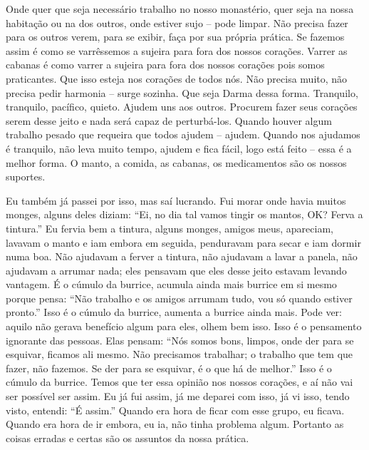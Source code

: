 Onde quer que seja necessário trabalho no nosso monastério, quer
seja na nossa habitação ou na dos outros, onde estiver sujo – pode
limpar. Não precisa fazer para os outros verem, para se exibir, faça
por sua própria prática. Se fazemos assim é como se varrêssemos a
sujeira para fora dos nossos corações. Varrer as cabanas é como varrer
a sujeira para fora dos nossos corações pois somos praticantes. Que
isso esteja nos corações de todos nós. Não precisa muito, não precisa
pedir harmonia – surge sozinha. Que seja Darma dessa forma. Tranquilo,
tranquilo, pacífico, quieto. Ajudem uns aos outros. Procurem fazer seus
corações serem desse jeito e nada será capaz de perturbá-los. Quando
houver algum trabalho pesado que requeira que todos ajudem – ajudem.
Quando nos ajudamos é tranquilo, não leva muito tempo, ajudem e fica
fácil, logo está feito – essa é a melhor forma. O manto, a comida, as
cabanas, os medicamentos são os nossos suportes.

Eu também já passei por isso, mas saí lucrando. Fui morar onde havia
muitos monges, alguns deles diziam: “Ei, no dia tal vamos tingir os
mantos, \textsc{OK}? Ferva a tintura.” Eu fervia bem a tintura, alguns monges,
amigos meus, apareciam, lavavam o manto e iam embora em seguida,
penduravam para secar e iam dormir numa boa. Não ajudavam a ferver a
tintura, não ajudavam a lavar a panela, não ajudavam a arrumar nada;
eles pensavam que eles desse jeito estavam levando vantagem. É o cúmulo
da burrice, acumula ainda mais burrice em si mesmo porque pensa: “Não
trabalho e os amigos arrumam tudo, vou só quando estiver pronto.” Isso
é o cúmulo da burrice, aumenta a burrice ainda mais. Pode ver: aquilo
não gerava benefício algum para eles, olhem bem isso. Isso é o
pensamento ignorante das pessoas. Elas pensam: “Nós somos bons, limpos,
onde der para se esquivar, ficamos ali mesmo. Não precisamos trabalhar;
o trabalho que tem que fazer, não fazemos. Se der para se esquivar, é o
que há de melhor.” Isso é o cúmulo da burrice. Temos que ter essa
opinião nos nossos corações, e aí não vai ser possível ser assim. Eu já
fui assim, já me deparei com isso, já vi isso, tendo visto, entendi: “É
assim.” Quando era hora de ficar com esse grupo, eu ficava. Quando era
hora de ir embora, eu ia, não tinha problema algum. Portanto as coisas
erradas e certas são os assuntos da nossa prática. 

